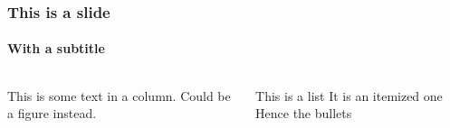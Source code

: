 \documentclass[aspectratio=169]{beamer}
\begin{document}
\begin{frame}
	\frametitle{This is a slide}
	\framesubtitle{With a subtitle}

	\begin{columns}
		\begin{column}{0.6\textwidth}
			This is some text in a column. Could be a figure instead.
		\end{column}
		\begin{column}{0.4\textwidth}
			\begin{outline}[itemize]
				\1
				This is a list
				\1
				It is an itemized one
				\1
				Hence the bullets
			\end{outline}
		\end{column}
	\end{columns}
\end{frame}

%     
% 
% 
\end{document}
